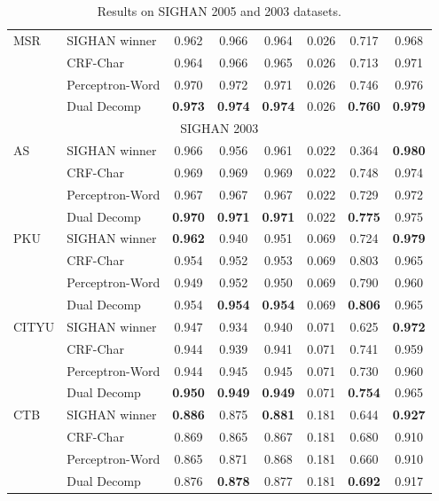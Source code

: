 \begin{table*}
\begin{small}
\begin{tabular}{ l | l | c | c | c | c | c | c   }
\hline
\multirow{4}{*}{MSR} &  SIGHAN winner      & 0.962  & 0.966 &  0.964 &  0.026 &   0.717 &   0.968 \\
& CRF-Char        &  0.964 &   0.966 &  0.965 & 0.026 & 0.713 & 0.971 \\
& Perceptron-Word &  0.970 &  0.972 &  0.971 & 0.026 & 0.746 & 0.976 \\
& Dual Decomp & \textbf{0.973} &  \textbf{0.974} &  \textbf{0.974} & 0.026 & \textbf{0.760} & \textbf{0.979} \\
\hline
\multicolumn{8}{c}{\large{SIGHAN 2003}} \\
\hline

\multirow{4}{*}{AS}  &  SIGHAN winner     & 0.966     & 0.956 &  0.961 & 0.022 & 0.364 &  \textbf{0.980} \\
& CRF-Char    & 0.969 & 0.969 & 0.969 & 0.022 & 0.748 &  0.974 \\
& Perceptron-Word &  0.967 & 0.967 & 0.967 & 0.022 & 0.729  & 0.972 \\
& Dual Decomp & \textbf{0.970} & \textbf{0.971} & \textbf{0.971} & 0.022 & \textbf{0.775}  & 0.975 \\
\hline
\multirow{4}{*}{PKU}  &  SIGHAN winner        &   \textbf{0.962} &   0.940&  0.951 & 0.069 & 0.724 & \textbf{0.979} \\
& CRF-Char     &  0.954 & 0.952 & 0.953 & 0.069 & 0.803	 & 0.965 \\
& Perceptron-Word &  0.949 & 0.952 & 0.950 & 0.069 & 0.790  & 0.960 \\
& Dual Decomp &  0.954 & \textbf{0.954} & \textbf{0.954}	 & 0.069 & \textbf{0.806} & 0.965 \\
\hline
\multirow{4}{*}{CITYU}  &  SIGHAN winner   &  0.947   & 0.934  & 0.940 & 0.071  &  0.625  &  \textbf{0.972} \\
& CRF-Char       &  0.944 & 0.939 & 0.941 & 0.071  & 0.741   & 0.959 \\
& Perceptron-Word &  0.944 & 0.945 & 0.945 & 0.071  & 0.730  &  0.960 \\
& Dual Decomp &  \textbf{0.950} & \textbf{0.949} & \textbf{0.949} & 0.071 & \textbf{0.754} &  0.965 \\
\hline
\multirow{4}{*}{CTB}  &  SIGHAN winner  &  \textbf{0.886}  & 0.875 &  \textbf{0.881} & 0.181 & 0.644  & \textbf{0.927} \\
& CRF-Char       & 0.869 & 0.865 & 0.867 & 0.181 & 0.680  & 0.910 \\
& Perceptron-Word & 0.865 & 0.871 & 0.868 & 0.181 & 0.660 & 0.910 \\
& Dual Decomp  & 0.876 & \textbf{0.878} & 0.877 & 0.181 & \textbf{0.692} & 0.917  \\


\end{tabular} 
\caption{Results on SIGHAN 2005 and 2003 datasets. }\label{tbl:results}
\end{small}
\end{table*}

